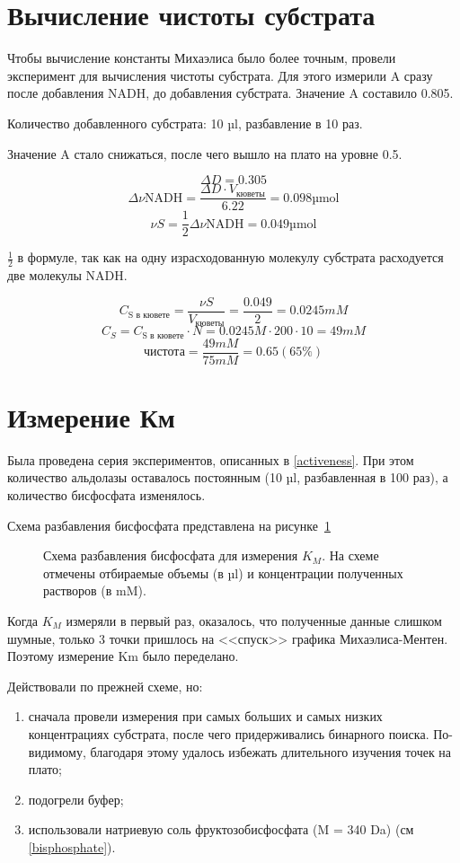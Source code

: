
\section{Вычисление чистоты субстрата}
Чтобы вычисление константы Михаэлиса было более точным, провели
эксперимент для вычисления чистоты субстрата.
Для этого измерили A сразу после добавления NADH, до добавления субстрата.
Значение A составило 0.805.

Количество добавленного субстрата: 10 µl, разбавление в 10 раз.

Значение A стало снижаться, после чего вышло на плато на уровне 0.5.

$$ \Delta D = 0.305 $$
$$ \Delta \nu\text{NADH} = \frac{\Delta D \cdot V_\text{кюветы}}{6.22} = 0.098 \text{µmol} $$
$$ \nu S = \frac{1}{2} \Delta \nu\text{NADH} = 0.049 \text{µmol} $$

$\frac{1}{2}$ в формуле, так как на одну израсходованную молекулу субстрата
расходуется две молекулы NADH.

$$ C_\text{S в кювете} = \frac{\nu S}{V_\text{кюветы}} = \frac{0.049}{2} = 0.0245 mM $$
$$ C_S = C_\text{S в кювете} \cdot N = 0.0245 M \cdot 200 \cdot 10 = 49 mM $$
$$ \text{чистота} = \frac{49 mM}{75 mM} = 0.65 (65 \%) $$


\section{Измерение Км}

Была проведена серия экспериментов, описанных в \ref{activeness}.
При этом количество альдолазы оставалось постоянным (10 µl, разбавленная в 100 раз),
а количество бисфосфата изменялось.

Схема разбавления бисфосфата представлена на рисунке~\ref{km-dilution}

\begin{figure}[htbp]
\def\svgwidth{\linewidth}
\caption{Схема разбавления бисфосфата для измерения $K_M$.
    На схеме отмечены отбираемые объемы (в µl) и
    концентрации полученных растворов (в mM).}
\label{km-dilution}
\end{figure}

Когда $K_M$ измеряли в первый раз, оказалось,
что полученные данные слишком шумные,
только 3 точки пришлось на <<спуск>> графика Михаэлиса-Ментен.
Поэтому измерение Km было переделано.

Действовали по прежней схеме, но:
\begin{enumerate}
\item сначала провели измерения при самых больших и самых низких концентрациях субстрата,
    после чего придерживались бинарного поиска.
    По-видимому, благодаря этому удалось избежать длительного изучения точек на плато;
\item подогрели буфер;
\item использовали натриевую соль фруктозобисфосфата (M = 340 Da) (см \ref{bisphosphate}).
\end{enumerate}

